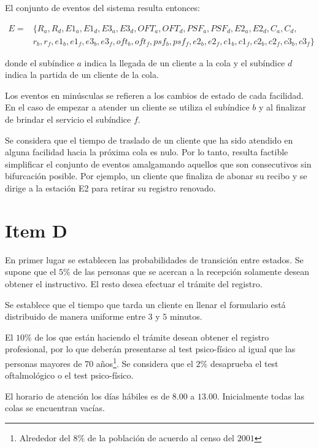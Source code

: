 \documentclass[a4paper,10pt]{article}
\begin{document}
El conjunto de eventos del sistema resulta entonces:

\begin{equation*}
\begin{split}
E = & \{R_a, R_d, E1_a, E1_d, E3_a, E3_d, OFT_a, OFT_d, PSF_a, PSF_d,
 E2_a, E2_d, C_a, C_d, \\
 & r_b, r_f, e1_b, e1_f, e3_b, e3_f, oft_b, oft_f,
 psf_b, psf_f, e2_b, e2_f, c1_b, c1_f, c2_b, c2_f, c3_b, c3_f \}
\end{split}
\end{equation*}


donde el sub\'indice $a$ indica la llegada de un cliente a la cola y el
sub\'indice $d$ indica la partida de un cliente de la cola.


Los eventos en min\'usculas se refieren a los cambios de estado de cada facilidad.
En el caso de empezar a atender un cliente se utiliza el sub\'indice $b$ y 
al finalizar de brindar el servicio el sub\'indice $f$.


Se considera que el tiempo de traslado de un cliente que ha sido atendido en
alguna facilidad hacia la pr\'oxima cola es nulo. Por lo tanto, resulta factible
simplificar el conjunto de eventos amalgamando aquellos que son
consecutivos sin bifurcaci\'{o}n posible. Por ejemplo, un cliente que finaliza
de abonar su recibo y se dirige a la estaci\'on E2 para retirar su registro
renovado.

\section*{Item D}


En primer lugar se establecen las probabilidades de transici\'on entre estados.
Se supone que el $5\%$ de las personas que se acercan a la recepci\'on solamente
desean obtener el instructivo. El resto desea efectuar el tr\'amite del
registro.


Se establece que el tiempo que tarda un cliente en llenar el formulario est\'a
distribuido de manera uniforme entre $3$ y $5$ minutos.


El $10\%$ de los que est\'an haciendo el tr\'amite
desean obtener el registro profesional, por lo que deber\'an presentarse
al test psico-f\'isico al igual que las personas mayores de $70$ a\~nos\footnote{Alrededor del $8\%$ de la poblaci\'on de acuerdo al censo del $2001$}.
Se considera que el $2\%$ desaprueba el test oftalmol\'ogico
o el test psico-f\'isico. 


El horario de atenci\'on los d\'ias h\'abiles es de $8.00$ a $13.00$. 
Inicialmente todas las colas se encuentran vac\'ias.
 
\end{document}
